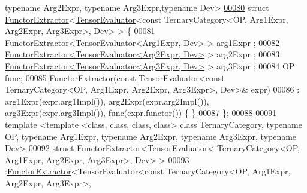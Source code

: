 \begin{DoxyCode}
{      typename} Arg2Expr, \textcolor{keyword}{typename} Arg3Expr,\textcolor{keyword}{typename} Dev>
\hyperlink{struct_eigen_1_1_tensor_sycl_1_1internal_1_1_functor_extractor_3_01_tensor_evaluator_3_01const_037059acf2b90c4daa8ccd3762a856f48}{00080} \textcolor{keyword}{struct }\hyperlink{struct_eigen_1_1_tensor_sycl_1_1internal_1_1_functor_extractor}{FunctorExtractor}<\hyperlink{struct_eigen_1_1_tensor_evaluator}{TensorEvaluator}<const TernaryCategory<OP, Arg1Expr, 
      Arg2Expr, Arg3Expr>, Dev> > \{
00081   \hyperlink{struct_eigen_1_1_tensor_sycl_1_1internal_1_1_functor_extractor}{FunctorExtractor<TensorEvaluator<Arg1Expr, Dev>} > arg1Expr
      ;
00082   \hyperlink{struct_eigen_1_1_tensor_sycl_1_1internal_1_1_functor_extractor}{FunctorExtractor<TensorEvaluator<Arg2Expr, Dev>} > arg2Expr
      ;
00083   \hyperlink{struct_eigen_1_1_tensor_sycl_1_1internal_1_1_functor_extractor}{FunctorExtractor<TensorEvaluator<Arg3Expr, Dev>} > arg3Expr
      ;
00084   OP \hyperlink{structfunc}{func};
00085   \hyperlink{struct_eigen_1_1_tensor_sycl_1_1internal_1_1_functor_extractor}{FunctorExtractor}(\textcolor{keyword}{const} \hyperlink{struct_eigen_1_1_tensor_evaluator}{TensorEvaluator}<\textcolor{keyword}{const} TernaryCategory<OP, Arg1Expr,
       Arg2Expr, Arg3Expr>, Dev>& expr)
00086   : arg1Expr(expr.arg1Impl()), arg2Expr(expr.arg2Impl()), arg3Expr(expr.arg3Impl()), func(expr.functor()) \{
      \}
00087 \};
00088 
00091 \textcolor{keyword}{template} <\textcolor{keyword}{template} <\textcolor{keyword}{class}, \textcolor{keyword}{class}, \textcolor{keyword}{class}, \textcolor{keyword}{class}> \textcolor{keyword}{class }TernaryCategory, \textcolor{keyword}{typename} OP, \textcolor{keyword}{typename} Arg1Expr, \textcolor{keyword}{
      typename} Arg2Expr, \textcolor{keyword}{typename} Arg3Expr, \textcolor{keyword}{typename} Dev>
\hyperlink{struct_eigen_1_1_tensor_sycl_1_1internal_1_1_functor_extractor_3_01_tensor_evaluator_3_01_ternar809ac865e821d3c7c11f9cca9cc0a9e8}{00092} \textcolor{keyword}{struct }\hyperlink{struct_eigen_1_1_tensor_sycl_1_1internal_1_1_functor_extractor}{FunctorExtractor}<\hyperlink{struct_eigen_1_1_tensor_evaluator}{TensorEvaluator}< TernaryCategory<OP, Arg1Expr, 
      Arg2Expr, Arg3Expr>, Dev> >
00093 :\hyperlink{struct_eigen_1_1_tensor_sycl_1_1internal_1_1_functor_extractor}{FunctorExtractor}<TensorEvaluator<const TernaryCategory<OP, Arg1Expr, Arg2Expr, Arg3Expr>, 

\end{DoxyCode}
